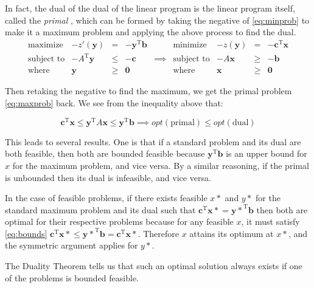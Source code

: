 \documentclass[12pt]{article}
\begin{document}
In fact, the dual of the dual of the linear program is the linear program itself, called the \textit{primal} \cite{trevisan}, which can be formed by taking the negative of \eqref{eq:minprob} to make it a maximum problem and applying the above process to find the dual.
\begin{equation} 
    \begin{array}{rrrrrrrcl}
        \text{maximize} & -z'(\mathbf{y}) & = & -\mathbf{y}^\text{T} \mathbf{b} & &  \text{minimize} & -z(\mathbf{y}) & = & -\mathbf{c}^\text{T} \mathbf{x}  \\
        \text{subject\ to} & -A^\text{T} \mathbf{y} & \leq & -\mathbf{c} & \implies &  \text{subject\ to} & -A \mathbf{x} & \geq & -\mathbf{b} \\
        \text{where} & \mathbf{y} & \geq & \mathbf{0} & & \text{where} & \mathbf{x} & \geq & \mathbf{0}
    \end{array}
\end{equation}

Then retaking the negative to find the maximum, we get the primal problem \eqref{eq:maxprob} back. We see from the inequality above that:

\begin{equation}\label{eq:bounds}
\mathbf{c}^\text{T} \mathbf{x} \leq \mathbf{y}^\text{T}A \mathbf{x} \leq \mathbf{y}^\text{T} \mathbf{b} \implies opt(\text{primal}) \leq opt(\text{dual})
\end{equation}

This leads to several results. One is that if a standard problem and its dual are both feasible, then both are bounded feasible because $\mathbf{y}^\text{T} \mathbf{b}$ is an upper bound for $x$ for the maximum problem, and vice versa. By a similar reasoning, if the primal is unbounded then its dual is infeasible, and vice versa.

In the case of feasible problems, if there exists feasible $x*$ and $y*$ for the standard maximum problem and its dual such that $\mathbf{c}^\text{T} \mathbf{x*} = \mathbf{y*}^\text{T} \mathbf{b}$ then both are optimal for their respective problems because for any feasible $x$, it must satisfy \eqref{eq:bounds} $\mathbf{c}^\text{T} \mathbf{x*} \leq \mathbf{y*}^\text{T} \mathbf{b} = \mathbf{c}^\text{T} \mathbf{x*}$. Therefore $x$ attains its optimum at $x*$, and the symmetric argument applies for $y*$.

The Duality Theorem tells us that such an optimal solution always exists if one of the problems is bounded feasible.
\end{document}
